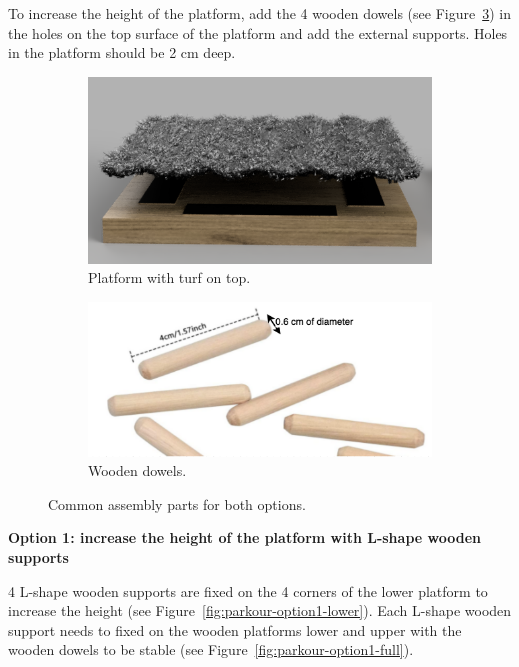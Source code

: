 {To increase the height of the platform,
add the 4 wooden dowels (see Figure~\ref{fig:parkour-wooden-dowels})
in the holes on the top surface of the platform and add the external supports.
Holes in the platform should be 2 cm deep.

\begin{figure}[htb]
  \begin{subfigure}{.45\textwidth}
    \centering
    \includegraphics[width=\textwidth]{img/parkour/top_turf}
    \caption{Platform with turf on top.}
    \label{fig:parkour-top-turf}
  \end{subfigure}
  \hfill
  \begin{subfigure}{.45\textwidth}
    \centering
    \includegraphics[width=\textwidth]{img/parkour/wooden_dowels}
    \caption{Wooden dowels.}
    \label{fig:parkour-wooden-dowels}
  \end{subfigure}
  \caption{Common assembly parts for both options.}
\end{figure}

\bigskip

{\bfseries Option 1: increase the height of the platform with L-shape wooden
           supports}

\headlinebox

4 L-shape wooden supports are fixed on the 4 corners of the lower platform to
increase the height (see Figure~\ref{fig:parkour-option1-lower}).
Each L-shape wooden support needs to fixed on the wooden platforms lower and
upper with the wooden dowels to be stable
(see Figure~\ref{fig:parkour-option1-full}). 

}
